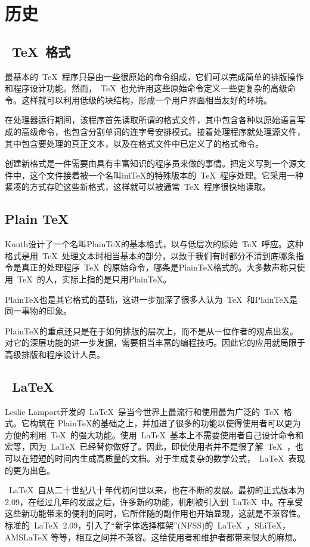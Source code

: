 \section{历史}
\subsection{~\TeX{}~格式}
最基本的~\TeX{}~程序只是由一些很原始的命令组成，它们可以完成简单的排版操作和程序设计功能。然而，~\TeX{}~也允许用这些原始命令定义一些更复杂的高级命令。这样就可以利用低级的块结构，形成一个用户界面相当友好的环境。


在处理器运行期间，该程序首先读取所谓的格式文件，其中包含各种以原始语言写成的高级命令，也包含分割单词的连字号安排模式。接着处理程序就处理源文件，其中包含要处理的真正文本，以及在格式文件中已定义了的格式命令。


创建新格式是一件需要由具有丰富知识的程序员来做的事情。把定义写到一个源文件中，这个文件接着被一个名叫iniTeX的特殊版本的~\TeX{}~程序处理。它采用一种紧凑的方式存贮这些新格式，这样就可以被通常~\TeX{}~程序很快地读取。
\subsection{Plain TeX}
Knuth设计了一个名叫PlainTeX的基本格式，以与低层次的原始~\TeX{}~呼应。这种格式是用~\TeX{}~处理文本时相当基本的部分，以致于我们有时都分不清到底哪条指令是真正的处理程序~\TeX{}~的原始命令，哪条是PlainTeX格式的。大多数声称只使用~\TeX{}~的人，实际上指的是只用PlainTeX。


PlainTeX也是其它格式的基础，这进一步加深了很多人认为~\TeX{}~和PlainTeX是同一事物的印象。


PlainTeX的重点还只是在于如何排版的层次上，而不是从一位作者的观点出发。对它的深层功能的进一步发掘，需要相当丰富的编程技巧。因此它的应用就局限于高级排版和程序设计人员。
\subsection{~\LaTeX{}~}
Leslie Lamport开发的~\LaTeX{}~是当今世界上最流行和使用最为广泛的~\TeX{}~格式。它构筑在 PlainTeX的基础之上，并加进了很多的功能以使得使用者可以更为方便的利用~\TeX{}~的强大功能。使用~\LaTeX{}~基本上不需要使用者自己设计命令和宏等，因为~\LaTeX{}~已经替你做好了。因此，即使使用者并不是很了解~\TeX{}~，也可以在短短的时间内生成高质量的文档。对于生成复杂的数学公式，~\LaTeX{}~表现的更为出色。


~\LaTeX{}~自从二十世纪八十年代初问世以来，也在不断的发展。最初的正式版本为 2.09，在经过几年的发展之后，许多新的功能，机制被引入到~\LaTeX{}~中。在享受这些新功能带来的便利的同时，它所伴随的副作用也开始显现，这就是不兼容性。标准的~\LaTeX{}~2.09，引入了“新字体选择框架”(NFSS)的~\LaTeX{}~，SLiTeX，AMSLaTeX 等等，相互之间并不兼容。这给使用者和维护者都带来很大的麻烦。
